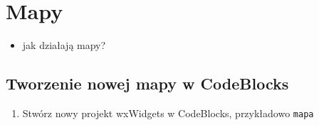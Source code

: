 \documentclass[10pt]{article}
\begin{document}
\section*{Mapy}
\begin{itemize}
  \item jak działają mapy?
\end{itemize}

\subsection*{Tworzenie nowej mapy w CodeBlocks}
\begin{enumerate}
  \item Stwórz nowy projekt wxWidgets w CodeBlocks, przykładowo \texttt{mapa}
\end{enumerate}
\end{document}
